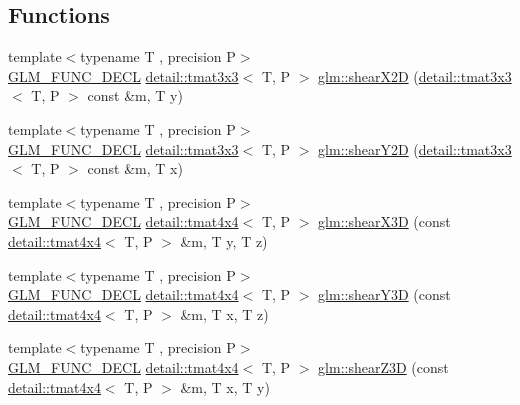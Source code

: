 \subsection*{Functions}
\begin{DoxyCompactItemize}
\item 
{\footnotesize template$<$typename T , precision P$>$ }\\\hyperlink{setup_8hpp_ab2d052de21a70539923e9bcbf6e83a51}{G\+L\+M\+\_\+\+F\+U\+N\+C\+\_\+\+D\+E\+CL} \hyperlink{structglm_1_1detail_1_1tmat3x3}{detail\+::tmat3x3}$<$ T, P $>$ \hyperlink{group__gtx__transform2_gaa5a2d9216b3298b03252e549de6fd98a}{glm\+::shear\+X2D} (\hyperlink{structglm_1_1detail_1_1tmat3x3}{detail\+::tmat3x3}$<$ T, P $>$ const \&m, T y)
\item 
{\footnotesize template$<$typename T , precision P$>$ }\\\hyperlink{setup_8hpp_ab2d052de21a70539923e9bcbf6e83a51}{G\+L\+M\+\_\+\+F\+U\+N\+C\+\_\+\+D\+E\+CL} \hyperlink{structglm_1_1detail_1_1tmat3x3}{detail\+::tmat3x3}$<$ T, P $>$ \hyperlink{group__gtx__transform2_ga1f5e68ada7a56cdf86c0c56d0b0a1832}{glm\+::shear\+Y2D} (\hyperlink{structglm_1_1detail_1_1tmat3x3}{detail\+::tmat3x3}$<$ T, P $>$ const \&m, T x)
\item 
{\footnotesize template$<$typename T , precision P$>$ }\\\hyperlink{setup_8hpp_ab2d052de21a70539923e9bcbf6e83a51}{G\+L\+M\+\_\+\+F\+U\+N\+C\+\_\+\+D\+E\+CL} \hyperlink{structglm_1_1detail_1_1tmat4x4}{detail\+::tmat4x4}$<$ T, P $>$ \hyperlink{group__gtx__transform2_gaae5bbb490a3d798b083cbec0e0c2e94c}{glm\+::shear\+X3D} (const \hyperlink{structglm_1_1detail_1_1tmat4x4}{detail\+::tmat4x4}$<$ T, P $>$ \&m, T y, T z)
\item 
{\footnotesize template$<$typename T , precision P$>$ }\\\hyperlink{setup_8hpp_ab2d052de21a70539923e9bcbf6e83a51}{G\+L\+M\+\_\+\+F\+U\+N\+C\+\_\+\+D\+E\+CL} \hyperlink{structglm_1_1detail_1_1tmat4x4}{detail\+::tmat4x4}$<$ T, P $>$ \hyperlink{group__gtx__transform2_ga4b5af90ecf76d312bb371f6111e1ae35}{glm\+::shear\+Y3D} (const \hyperlink{structglm_1_1detail_1_1tmat4x4}{detail\+::tmat4x4}$<$ T, P $>$ \&m, T x, T z)
\item 
{\footnotesize template$<$typename T , precision P$>$ }\\\hyperlink{setup_8hpp_ab2d052de21a70539923e9bcbf6e83a51}{G\+L\+M\+\_\+\+F\+U\+N\+C\+\_\+\+D\+E\+CL} \hyperlink{structglm_1_1detail_1_1tmat4x4}{detail\+::tmat4x4}$<$ T, P $>$ \hyperlink{group__gtx__transform2_ga02fa747667daf42b64ea344d1076acee}{glm\+::shear\+Z3D} (const \hyperlink{structglm_1_1detail_1_1tmat4x4}{detail\+::tmat4x4}$<$ T, P $>$ \&m, T x, T y)

\end{DoxyCompactItemize}
